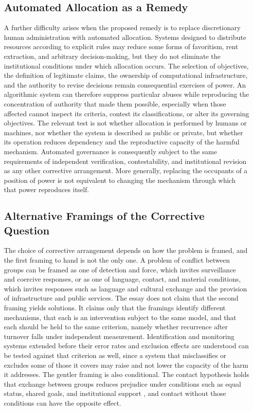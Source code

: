 \documentclass[12pt]{article}
\theoremstyle{remark}
\begin{document}
\subsection{Automated Allocation as a Remedy}

A further difficulty arises when the proposed remedy is to replace discretionary human administration with automated allocation. Systems designed to distribute resources according to explicit rules may reduce some forms of favoritism, rent extraction, and arbitrary decision-making, but they do not eliminate the institutional conditions under which allocation occurs. The selection of objectives, the definition of legitimate claims, the ownership of computational infrastructure, and the authority to revise decisions remain consequential exercises of power. An algorithmic system can therefore suppress particular abuses while reproducing the concentration of authority that made them possible, especially when those affected cannot inspect its criteria, contest its classifications, or alter its governing objectives. The relevant test is not whether allocation is performed by humans or machines, nor whether the system is described as public or private, but whether its operation reduces dependency and the reproductive capacity of the harmful mechanism. Automated governance is consequently subject to the same requirements of independent verification, contestability, and institutional revision as any other corrective arrangement. More generally, replacing the occupants of a position of power is not equivalent to changing the mechanism through which that power reproduces itself.

\subsection{Alternative Framings of the Corrective Question}

The choice of corrective arrangement depends on how the problem is framed, and the first framing to hand is not the only one. A problem of conflict between groups can be framed as one of detection and force, which invites surveillance and coercive responses, or as one of language, contact, and material conditions, which invites responses such as language and cultural exchange and the provision of infrastructure and public services. The essay does not claim that the second framing yields solutions. It claims only that the framings identify different mechanisms, that each is an intervention subject to the same model, and that each should be held to the same criterion, namely whether recurrence after turnover falls under independent measurement. Identification and monitoring systems extended before their error rates and exclusion effects are understood can be tested against that criterion as well, since a system that misclassifies or excludes some of those it covers may raise and not lower the capacity of the harm it addresses. The gentler framing is also conditional. The contact hypothesis holds that exchange between groups reduces prejudice under conditions such as equal status, shared goals, and institutional support \cite{allport1954,pettigrew2006}, and contact without those conditions can have the opposite effect.
\end{document}
